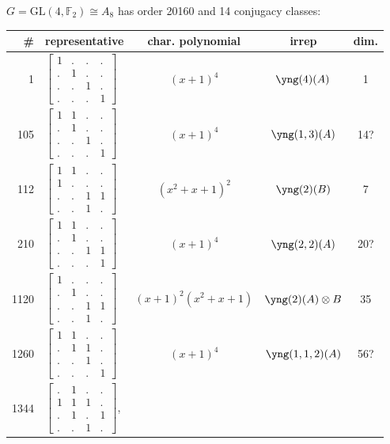 \documentclass[11pt,oneside]{article}
\newcommand{\GL}{\mathrm{GL}}
\newcommand{\Field}{\mathbb{F}}
\newcommand{\tensor}{\otimes}
\begin{document}
$G=\GL(4,\Field_2)\cong A_8$ has order 20160 and 14 conjugacy classes:
\begin{center}
\begin{tabular}{r|l|c|c|c}
\# & representative & char. polynomial & irrep & dim. \\
\hline
1  & $\begin{bmatrix}1&.&.&.\\.&1&.&.\\.&.&1&.\\.&.&.&1\end{bmatrix}$  & $(x+1)^4$  & $\yng(4)(A)$ & 1  \\
105  & $\begin{bmatrix}1&1&.&.\\.&1&.&.\\.&.&1&.\\.&.&.&1\end{bmatrix}$  & $(x+1)^4$  & $\yng(1,3)(A)$ & 14?  \\
112  & $\begin{bmatrix}1&1&.&.\\1&.&.&.\\.&.&1&1\\.&.&1&.\end{bmatrix}$  & $(x^2+x+1)^2$  & $\yng(2)(B)$ & 7  \\
210  & $\begin{bmatrix}1&1&.&.\\.&1&.&.\\.&.&1&1\\.&.&.&1\end{bmatrix}$  & $(x+1)^4$  & $\yng(2,2)(A)$ & 20?  \\
1120  & $\begin{bmatrix}1&.&.&.\\.&1&.&.\\.&.&1&1\\.&.&1&.\end{bmatrix}$
  & $(x+1)^2(x^2+x+1)$  & $\yng(2)(A)\tensor B$ & 35  \\
1260  & $\begin{bmatrix}1&1&.&.\\.&1&1&.\\.&.&1&.\\.&.&.&1\end{bmatrix}$  & $(x+1)^4$  & $\yng(1,1,2)(A)$ & 56?  \\
1344  & 
$\begin{bmatrix}.&1&.&.\\1&1&1&.\\.&1&.&1\\.&.&1&.\end{bmatrix}$,

\end{tabular}
\end{center}
\end{document}

